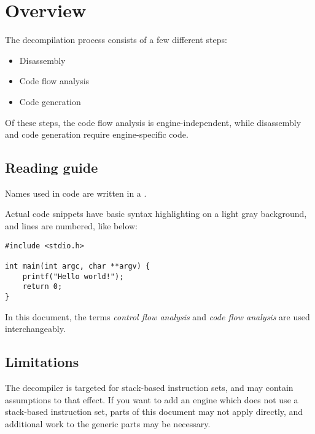 \section{Overview}
The decompilation process consists of a few different steps:

\begin{itemize}
\item Disassembly
\item Code flow analysis
\item Code generation
\end{itemize}

Of these steps, the code flow analysis is engine-independent, while disassembly and code generation require engine-specific code.

\subsection{Reading guide}
Names used in code are written in a .

Actual code snippets have basic syntax highlighting on a light gray background, and lines are numbered, like below:

\begin{C++}
\begin{lstlisting}
#include <stdio.h>

int main(int argc, char **argv) {
	printf("Hello world!");
	return 0;
}
\end{lstlisting}
\end{C++}

In this document, the terms \emph{control flow analysis} and \emph{code flow analysis} are used interchangeably.

\subsection{Limitations}
The decompiler is targeted for stack-based instruction sets, and may contain assumptions to that effect. If you want to add an engine which does not use a stack-based instruction set, parts of this document may not apply directly, and additional work to the generic parts may be necessary.
